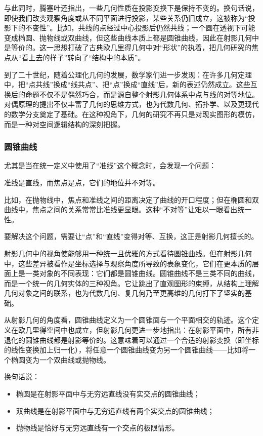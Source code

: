 与此同时，腾塞叶还指出，一些几何性质在投影变换下是保持不变的。换句话说，即使我们改变观察角度或从不同平面进行投影，某些关系仍旧成立，这被称为“投影下的不变性”。比如，共线的点经过中心投影后仍然共线；一个圆在透视下可能变成椭圆、抛物线或双曲线，但这些曲线本质上都是圆锥曲线，因此在射影几何中是等价的。这一思想打破了古典欧几里得几何中对“形状”的执着，把几何研究的焦点从“看上去的样子”转向了“结构中的本质”。

到了二十世纪，随着公理化几何的发展，数学家们进一步发现：在许多几何定理中，把“点共线”换成“线共点”、把“点”换成“直线”后，新的表述仍然成立。这些互换后的命题不仅不是偶然巧合，而是源自整个射影几何体系中点与线的对等地位。对偶原理的提出不仅丰富了几何的思维方式，也为代数几何、拓扑学、以及更现代的数学分支奠定了基础。在这种视角下，几何的研究不再只是对现实图形的模仿，而是一种对空间逻辑结构的深刻把握。


\subsubsection{圆锥曲线}


尤其是当在统一定义中使用了“准线”这个概念时，会发现一个问题：

准线是直线，而焦点是点，它们的地位并不对等。

比如，在抛物线中，焦点和准线之间的距离决定了曲线的开口程度；但在椭圆和双曲线中，焦点之间的关系常常比准线更显眼。这种“不对等”让难以一眼看出统一性。

要解决这个问题，需要让“点”和“直线”变得对等、互换，这正是射影几何擅长的。




射影几何中的视角使能够用一种统一且优雅的方式看待圆锥曲线。但在射影几何中，这些差异被看作是坐标选择与观察角度所导致的表象变化，它们在更本质的层面上是一类对象的不同表现：它们都是圆锥曲线。圆锥曲线不是三类不同的曲线，而是一个统一的几何实体的三种视角。它让跳出了直观图形的束缚，从结构上理解几何对象之间的联系，也为代数几何、复几何乃至更高维的几何打下了坚实的基础。

从射影几何的角度看，圆锥曲线定义为一个圆锥面与一个平面相交的轨迹。这个定义在欧几里得空间中也成立，但射影几何更进一步地指出：在射影平面中，所有非退化的圆锥曲线都是射影等价的。这意味着可以通过一个合适的射影变换（即坐标的线性变换加上归一化），将任意一个圆锥曲线变为另一个圆锥曲线——比如将一个椭圆变为一个双曲线或抛物线。

换句话说：
\begin{itemize}
\item 椭圆是在射影平面中与无穷远直线没有实交点的圆锥曲线；
\item 双曲线是在射影平面中与无穷远直线有两个实交点的圆锥曲线；
\item 抛物线是恰好与无穷远直线有一个交点的极限情形。
\end{itemize}

